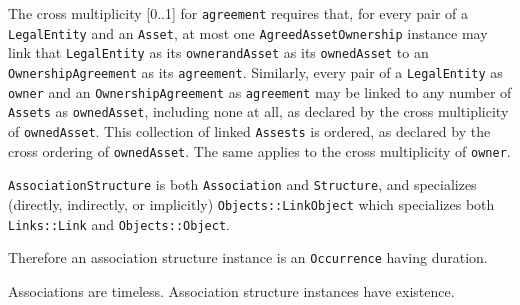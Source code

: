 \pn The cross multiplicity [0..1] for \texttt{agreement} requires that, for every pair of a \texttt{LegalEntity} and an \texttt{Asset}, at most
one \texttt{AgreedAssetOwnership} instance may link that \texttt{LegalEntity} as its \texttt{ownerandAsset} as its \texttt{ownedAsset} to
an \texttt{OwnershipAgreement} as its \texttt{agreement}. Similarly, every pair of a \texttt{LegalEntity} as \texttt{owner} and an
\texttt{OwnershipAgreement} as \texttt{agreement} may be linked to any number of \texttt{Assets} as \texttt{ownedAsset}, including none at
all, as declared by the cross multiplicity of \texttt{ownedAsset}. This collection of linked \texttt{Assests} is ordered, as declared
by the cross ordering of \texttt{ownedAsset}. The same applies to the cross multiplicity of \texttt{owner}.


\texttt{AssociationStructure} is both \texttt{Association} and \texttt{Structure}, and specializes (directly, indirectly, or implicitly) \texttt{Objects::LinkObject} which specializes 
both \texttt{Links::Link} and \texttt{Objects::Object}.

Therefore an association structure instance is an \texttt{Occurrence} having duration.

Associations are timeless.  Association structure instances have existence.


